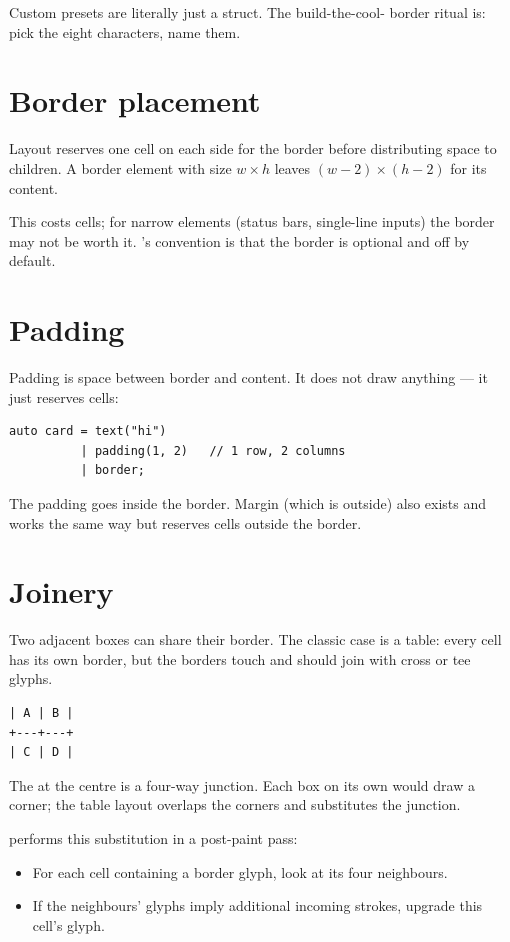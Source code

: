 Custom presets are literally just a struct. The build-the-cool-
border ritual is: pick the eight characters, name them.

\section{Border placement}

Layout reserves one cell on each side for the border before
distributing space to children. A border element with size $w
\times h$ leaves $(w-2) \times (h-2)$ for its content.

This costs cells; for narrow elements (status bars, single-line
inputs) the border may not be worth it. \maya{}'s convention is
that the border is optional and off by default.

\section{Padding}

Padding is space between border and content. It does not draw
anything --- it just reserves cells:

\begin{lstlisting}
auto card = text("hi")
          | padding(1, 2)   // 1 row, 2 columns
          | border;
\end{lstlisting}

The padding goes inside the border. Margin (which is outside)
also exists and works the same way but reserves cells outside
the border.

\section{Joinery}

Two adjacent boxes can share their border. The classic case is a
table: every cell has its own border, but the borders touch and
should join with cross or tee glyphs.

\begin{lstlisting}
| A | B |
+---+---+
| C | D |
\end{lstlisting}

The \code{+} at the centre is a four-way junction. Each box on
its own would draw a corner; the table layout overlaps the
corners and substitutes the junction.

\maya{} performs this substitution in a post-paint pass:
\begin{itemize}[leftmargin=*]
  \item For each cell containing a border glyph, look at its
    four neighbours.
  \item If the neighbours' glyphs imply additional incoming
    strokes, upgrade this cell's glyph.
\end{itemize}

